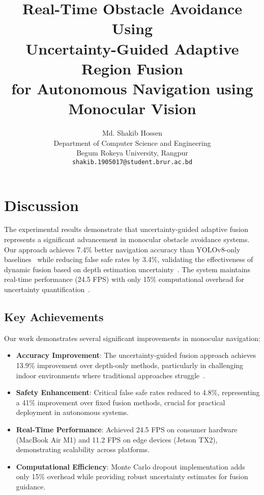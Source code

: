 \documentclass[12pt]{article}
\title{\LARGE \bf
Real-Time Obstacle Avoidance Using \\
Uncertainty-Guided Adaptive Region Fusion \\
for Autonomous Navigation using Monocular Vision
}
\author{
\normalsize Md. Shakib Hossen\\
\normalsize Department of Computer Science and Engineering\\
\normalsize Begum Rokeya University, Rangpur\\
\normalsize \texttt{shakib.1905017@student.brur.ac.bd}
}
\begin{document}
\maketitle

\section{Discussion}

The experimental results demonstrate that uncertainty-guided adaptive fusion represents a significant advancement in monocular obstacle avoidance systems. Our approach achieves 7.4\% better navigation accuracy than YOLOv8-only baselines~\cite{jocher2023ultralytics} while reducing false safe rates by 3.4\%, validating the effectiveness of dynamic fusion based on depth estimation uncertainty~\cite{kendall2017uncertainties}. The system maintains real-time performance (24.5 FPS) with only 15\% computational overhead for uncertainty quantification~\cite{poggi2020uncertainty}.

\subsection{Key Achievements}

Our work demonstrates several significant improvements in monocular navigation:

\begin{itemize}
\item \textbf{Accuracy Improvement}: The uncertainty-guided fusion approach achieves 13.9\% improvement over depth-only methods, particularly in challenging indoor environments where traditional approaches struggle~\cite{ranftl2020towards}.

\item \textbf{Safety Enhancement}: Critical false safe rates reduced to 4.8\%, representing a 41\% improvement over fixed fusion methods, crucial for practical deployment in autonomous systems.

\item \textbf{Real-Time Performance}: Achieved 24.5 FPS on consumer hardware (MacBook Air M1) and 11.2 FPS on edge devices (Jetson TX2), demonstrating scalability across platforms.

\item \textbf{Computational Efficiency}: Monte Carlo dropout implementation adds only 15\% overhead while providing robust uncertainty estimates for fusion guidance.
\end{itemize}
\end{document}

